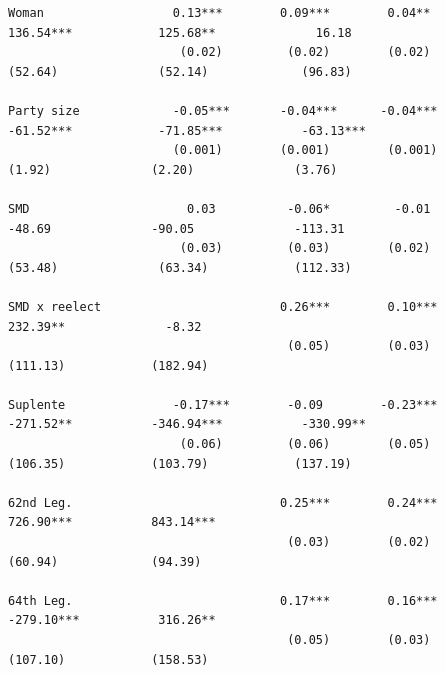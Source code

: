 \documentclass[letter,12pt]{article}
\begin{document}
\begin{table}
\begin{tiny}
\begin{verbatim}
Woman                  0.13***        0.09***        0.04**            136.54***            125.68**              16.18    
                        (0.02)         (0.02)        (0.02)             (52.64)              (52.14)             (96.83)   
                                                                                                                           
Party size             -0.05***       -0.04***      -0.04***           -61.52***            -71.85***           -63.13***  
                       (0.001)        (0.001)        (0.001)             (1.92)              (2.20)              (3.76)    
                                                                                                                           
SMD                      0.03          -0.06*         -0.01              -48.69              -90.05              -113.31   
                        (0.03)         (0.03)        (0.02)             (53.48)              (63.34)            (112.33)   
                                                                                                                           
SMD x reelect                         0.26***        0.10***                                232.39**              -8.32    
                                       (0.05)        (0.03)                                 (111.13)            (182.94)   
                                                                                                                           
Suplente               -0.17***        -0.09        -0.23***           -271.52**           -346.94***           -330.99**  
                        (0.06)         (0.06)        (0.05)             (106.35)            (103.79)            (137.19)   
                                                                                                                           
62nd Leg.                             0.25***        0.24***                                726.90***           843.14***  
                                       (0.03)        (0.02)                                  (60.94)             (94.39)   
                                                                                                                           
64th Leg.                             0.17***        0.16***                               -279.10***           316.26**   
                                       (0.05)        (0.03)                                 (107.10)            (158.53)   
                                                                                                                           

\end{verbatim}
\end{tiny}
\end{table}
\end{document}
